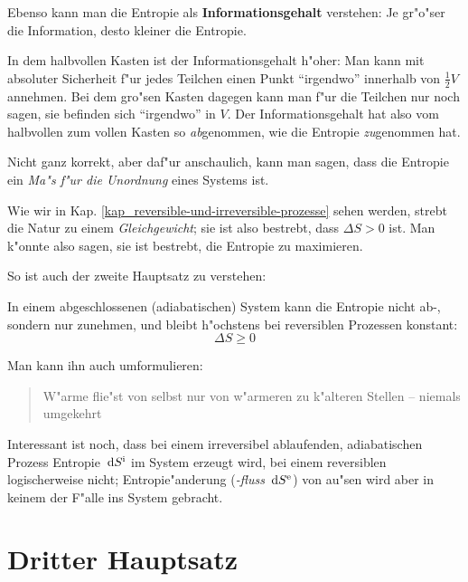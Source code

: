 Ebenso kann man die Entropie als \textbf{Informationsgehalt}
verstehen: Je gr"o"ser die Information, desto kleiner die Entropie. 
\begin{Beispiel}
   In dem halbvollen Kasten ist der Informationsgehalt h"oher: Man kann
   mit absoluter Sicherheit f"ur jedes Teilchen einen Punkt
   "`irgendwo"' innerhalb von $\frac{1}{2}V$ annehmen. Bei dem gro"sen
   Kasten dagegen kann man f"ur die Teilchen nur noch sagen, sie
   befinden sich "`irgendwo"' in $V$. Der Informationsgehalt hat also
   vom halbvollen zum vollen Kasten so \emph{ab}genommen, wie die
   Entropie \emph{zu}genommen hat.
\end{Beispiel}

Nicht ganz korrekt, aber daf"ur anschaulich, kann
man sagen, dass die Entropie ein \emph{Ma"s f"ur die Unordnung} eines
Systems ist.

\abs 
Wie wir in Kap. \ref{kap_reversible-und-irreversible-prozesse}
sehen werden, strebt die Natur zu einem \emph{Gleichgewicht}; sie ist
also bestrebt, dass $\Delta S > 0$ ist. Man k"onnte also sagen, sie
ist bestrebt, die Entropie zu maximieren.

So ist auch der zweite Hauptsatz zu verstehen:
\begin{Wichtig}
In einem abgeschlossenen (adiabatischen) System kann die Entropie
nicht ab-, sondern nur zunehmen, und bleibt h"ochstens bei reversiblen
Prozessen konstant:
\begin{equation}
   \label{eqn_zwetier-hauptsatz}
   \boxed{
\Delta S \geq 0
}
\end{equation}
\end{Wichtig}
Man kann ihn auch umformulieren:
\begin{quote}
   W"arme flie"st von selbst nur von w"armeren zu k"alteren Stellen --
   niemals umgekehrt
\end{quote}

Interessant ist noch, dass bei einem irreversibel ablaufenden,
adiabatischen Prozess Entropie $\, \mathrm{d} S^\text{i}$ im System erzeugt
wird, bei einem reversiblen logischerweise nicht; Entropie"anderung
(\emph{-fluss} $\, \mathrm{d} S^\text{e}$) von au"sen wird aber in keinem der
F"alle ins System gebracht.







\section{Dritter Hauptsatz}
\label{kap_dritter-hauptsatz}


